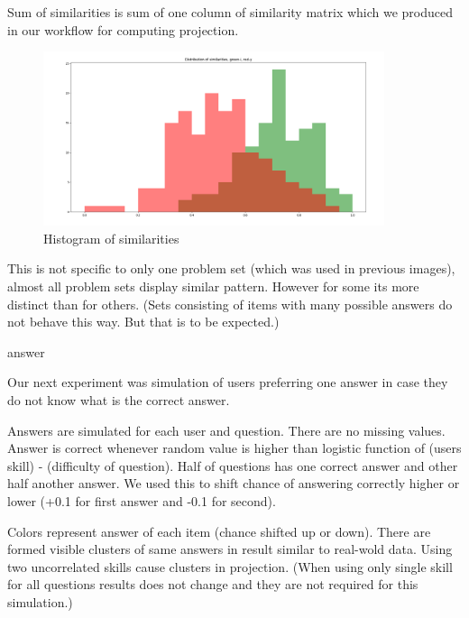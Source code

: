 \documentclass[
  digital, %
  table,   %
  nolof,     %
  nolot,     %
  nocover
]{fithesis3}
\begin{document}
Sum of similarities is sum of one column of similarity matrix which we
produced in our workflow for computing projection.

\begin{figure}
  \begin{center}
    \includegraphics[width=10cm]{img/iy_histogram}
  \end{center}
  \caption{Histogram of similarities}
  \label{ref:iyhistogram}
\end{figure}



This is not specific to only one problem set (which was used in previous
images), almost all problem sets display similar pattern. However for
some its more distinct than for others. (Sets consisting of items with
many possible answers do not behave this way. But that is to be
expected.)

answer

Our next experiment was simulation of users preferring one answer in
case they do not know what is the correct answer.

Answers are simulated for each user and question. There are no missing
values. Answer is correct whenever random value is higher than logistic
function of (users skill) - (difficulty of question). Half of questions
has one correct answer and other half another answer. We used this to
shift chance of answering correctly higher or lower (+0.1 for first
answer and -0.1 for second).


Colors represent answer of each item (chance shifted up or down). There
are formed visible clusters of same answers in result similar to
real-wold data. Using two uncorrelated skills cause clusters in
projection. (When using only single skill for all questions results does
not change and they are not required for this simulation.)
\end{document}
